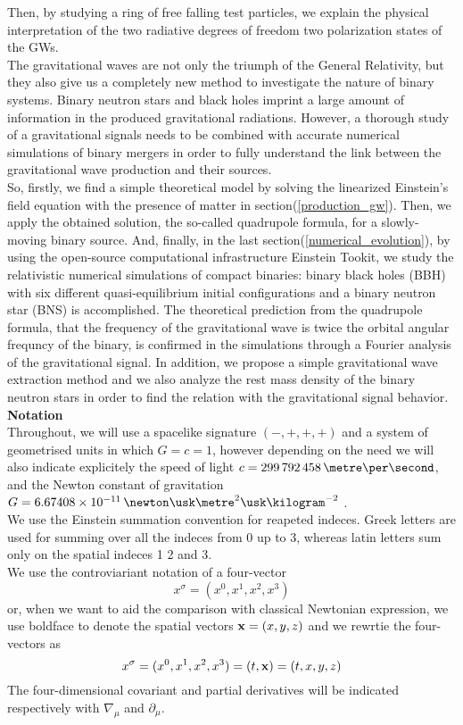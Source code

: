 Then, by studying a ring of free falling test particles, we explain the physical interpretation of the two radiative degrees of freedom two polarization states of the GWs.\\
The gravitational waves are not only the triumph of the General Relativity, but they also give us a completely new method to investigate the nature of binary systems. 
Binary neutron stars and black holes imprint a large amount of information in the produced gravitational radiations.
However, a thorough study of a gravitational signals needs to be combined with accurate numerical simulations of binary mergers in order to fully understand the link between the  gravitational wave production and their sources.\\
So, firstly, we find a simple theoretical model by solving the linearized Einstein's field equation with the presence of matter in section(\ref{production_gw}).
Then, we apply the obtained solution, the so-called quadrupole formula, for a slowly-moving binary source.
And, finally, in the last section(\ref{numerical_evolution}), by using the open-source computational infrastructure Einstein Tookit\cite{loffler_einstein_2012}, we study the relativistic numerical simulations of compact binaries: binary black holes (BBH) with six different quasi-equilibrium initial configurations and a binary neutron star (BNS) is accomplished.
The theoretical prediction from the quadrupole formula, that the frequency of the gravitational wave is twice the orbital angular frequncy of the binary, is confirmed in the simulations through a Fourier analysis of the gravitational signal.
In addition, we propose a simple gravitational wave extraction method and we also analyze the rest mass density of the binary neutron stars in order to find the relation with the gravitational signal behavior.\\

\textbf{Notation}\\
Throughout, we will use a spacelike signature $(-,+,+,+)$ and a system of geometrised units in which $G=c=1$, however depending on the need we will also indicate explicitely the speed of light $c=299\,792\,458 \,\metre \per \second$, and the Newton constant of gravitation $G=6.67408 \times 10^{-11} \, \newton \usk \metre^2 \usk \kilogram^{-2}$ \cite{codata_blog_codata_nodate}.\\
We use the Einstein summation convention for  reapeted indeces.
Greek letters are used for summing over all the indeces from 0 up to 3,
whereas latin letters sum only on the spatial indeces 1 2 and 3.\\
We use the controviariant notation of a four-vector
\[
x^{\sigma} = (x^{0},x^{1}, x^{2},x^{3})
\]
or, when we want to aid the comparison with classical Newtonian expression, we use boldface to denote the spatial vectors $\vb{x} =(x,y,z)$ and we rewrtie the four-vectors as 
\[
x^{\sigma} = (x^{0},x^{1}, x^{2},x^{3}) = (t,\vb{x}) = (t,x,y,z)
\]
The four-dimensional covariant and partial derivatives will be indicated respectively with $\nabla _{\mu}$ and $\partial _\mu$.\\

